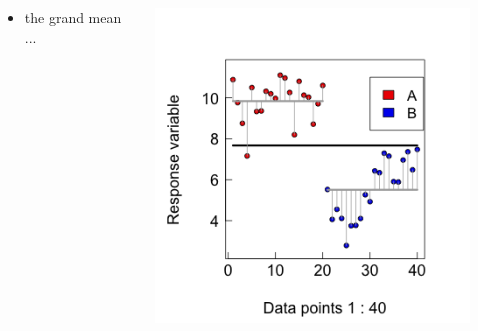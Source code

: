 \documentclass{beamer}
\begin{document}
\begin{frame}{}
  \begin{columns}[onlytextwidth] %
    \begin{column}{0.44\textwidth}
  \begin{itemize}
    \item the grand mean ...
  \end{itemize}
    \end{column}
    \hspace{0.02\textwidth} %
    \begin{column}{0.6\textwidth}
      \begin{center}
        \includegraphics[width=0.9\textwidth]{lectures/day_1_intro_to_mems/figures/unnamed-chunk-22-1.png}
      \end{center}
    \end{column}
  \end{columns}
\end{frame}
\end{document}
